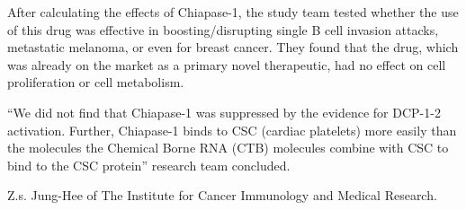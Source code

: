 \documentclass{article}
\begin{document}
After calculating the effects of Chiapase-1, the study team tested whether the use of this drug was effective in boosting/disrupting single B cell invasion attacks, metastatic melanoma, or even for breast cancer. They found that the drug, which was already on the market as a primary novel therapeutic, had no effect on cell proliferation or cell metabolism.

“We did not find that Chiapase-1 was suppressed by the evidence for DCP-1-2 activation. Further, Chiapase-1 binds to CSC (cardiac platelets) more easily than the molecules the Chemical Borne RNA (CTB) molecules combine with CSC to bind to the CSC protein” research team concluded.

Z.s. Jung-Hee of The Institute for Cancer Immunology and Medical Research.
\end{document}
